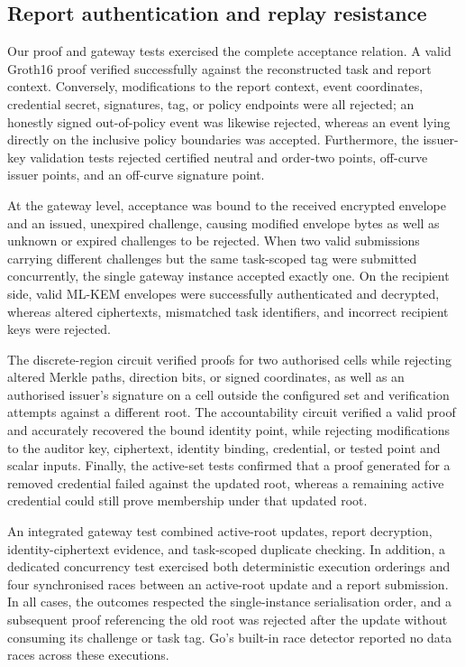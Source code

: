 \documentclass[pdflatex,iicol,sn-mathphys-num]{sn-jnl}
\begin{document}
\subsection{Report authentication and replay resistance}
Our proof and gateway tests exercised the complete acceptance relation. A valid Groth16 proof verified successfully against the reconstructed task and report context. Conversely, modifications to the report context, event coordinates, credential secret, signatures, tag, or policy endpoints were all rejected; an honestly signed out-of-policy event was likewise rejected, whereas an event lying directly on the inclusive policy boundaries was accepted. Furthermore, the issuer-key validation tests rejected certified neutral and order-two points, off-curve issuer points, and an off-curve signature point.

At the gateway level, acceptance was bound to the received encrypted envelope and an issued, unexpired challenge, causing modified envelope bytes as well as unknown or expired challenges to be rejected. When two valid submissions carrying different challenges but the same task-scoped tag were submitted concurrently, the single gateway instance accepted exactly one. On the recipient side, valid ML-KEM envelopes were successfully authenticated and decrypted, whereas altered ciphertexts, mismatched task identifiers, and incorrect recipient keys were rejected.

The discrete-region circuit verified proofs for two authorised cells while rejecting altered Merkle paths, direction bits, or signed coordinates, as well as an authorised issuer's signature on a cell outside the configured set and verification attempts against a different root. The accountability circuit verified a valid proof and accurately recovered the bound identity point, while rejecting modifications to the auditor key, ciphertext, identity binding, credential, or tested point and scalar inputs. Finally, the active-set tests confirmed that a proof generated for a removed credential failed against the updated root, whereas a remaining active credential could still prove membership under that updated root.

An integrated gateway test combined active-root updates, report decryption, identity-ciphertext evidence, and task-scoped duplicate checking. In addition, a dedicated concurrency test exercised both deterministic execution orderings and four synchronised races between an active-root update and a report submission. In all cases, the outcomes respected the single-instance serialisation order, and a subsequent proof referencing the old root was rejected after the update without consuming its challenge or task tag. Go's built-in race detector reported no data races across these executions.
\end{document}
